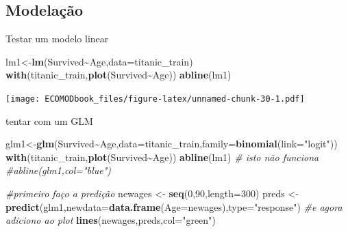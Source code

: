 \documentclass[
]{book}
\newenvironment{Shaded}{\begin{snugshade}}{\end{snugshade}}
\newcommand{\AttributeTok}[1]{\textcolor[rgb]{0.13,0.29,0.53}{#1}}
\newcommand{\CommentTok}[1]{\textcolor[rgb]{0.56,0.35,0.01}{\textit{#1}}}
\newcommand{\DecValTok}[1]{\textcolor[rgb]{0.00,0.00,0.81}{#1}}
\newcommand{\FunctionTok}[1]{\textcolor[rgb]{0.13,0.29,0.53}{\textbf{#1}}}
\newcommand{\NormalTok}[1]{#1}
\newcommand{\OtherTok}[1]{\textcolor[rgb]{0.56,0.35,0.01}{#1}}
\newcommand{\SpecialCharTok}[1]{\textcolor[rgb]{0.81,0.36,0.00}{\textbf{#1}}}
\newcommand{\StringTok}[1]{\textcolor[rgb]{0.31,0.60,0.02}{#1}}
\begin{document}
\hypertarget{modelauxe7uxe3o}{%
\subsection{Modelação}\label{modelauxe7uxe3o}}

Testar um modelo linear

\begin{Shaded}
\begin{Highlighting}[]
\NormalTok{lm1}\OtherTok{\textless{}{-}}\FunctionTok{lm}\NormalTok{(Survived}\SpecialCharTok{\textasciitilde{}}\NormalTok{Age,}\AttributeTok{data=}\NormalTok{titanic\_train)}
\FunctionTok{with}\NormalTok{(titanic\_train,}\FunctionTok{plot}\NormalTok{(Survived}\SpecialCharTok{\textasciitilde{}}\NormalTok{Age))}
\FunctionTok{abline}\NormalTok{(lm1)}
\end{Highlighting}
\end{Shaded}

\texttt{[image: ECOMODbook\_files/figure-latex/unnamed-chunk-30-1.pdf]}

tentar com um GLM

\begin{Shaded}
\begin{Highlighting}[]
\NormalTok{glm1}\OtherTok{\textless{}{-}}\FunctionTok{glm}\NormalTok{(Survived}\SpecialCharTok{\textasciitilde{}}\NormalTok{Age,}\AttributeTok{data=}\NormalTok{titanic\_train,}\AttributeTok{family=}\FunctionTok{binomial}\NormalTok{(}\AttributeTok{link=}\StringTok{"logit"}\NormalTok{))}
\FunctionTok{with}\NormalTok{(titanic\_train,}\FunctionTok{plot}\NormalTok{(Survived}\SpecialCharTok{\textasciitilde{}}\NormalTok{Age))}
\FunctionTok{abline}\NormalTok{(lm1)}
\CommentTok{\# isto não funciona}
\CommentTok{\#abline(glm1,col="blue")}

\CommentTok{\#primeiro faço a predição}
\NormalTok{newages }\OtherTok{\textless{}{-}} \FunctionTok{seq}\NormalTok{(}\DecValTok{0}\NormalTok{,}\DecValTok{90}\NormalTok{,}\AttributeTok{length=}\DecValTok{300}\NormalTok{)}
\NormalTok{preds }\OtherTok{\textless{}{-}} \FunctionTok{predict}\NormalTok{(glm1,}\AttributeTok{newdata=}\FunctionTok{data.frame}\NormalTok{(}\AttributeTok{Age=}\NormalTok{newages),}\AttributeTok{type=}\StringTok{"response"}\NormalTok{)}
\CommentTok{\#e agora adiciono ao plot}
\FunctionTok{lines}\NormalTok{(newages,preds,}\AttributeTok{col=}\StringTok{"green"}\NormalTok{)}
\end{Highlighting}
\end{Shaded}
\end{document}
